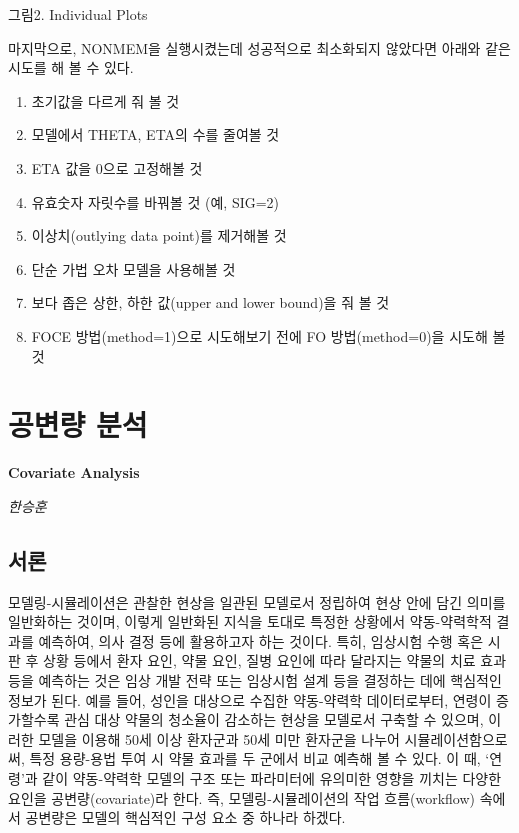 \documentclass[
  10pt,
]{krantz}
\providecommand{\tightlist}{%
  \setlength{\itemsep}{0pt}\setlength{\parskip}{0pt}}
\begin{document}
그림2. Individual Plots

마지막으로, NONMEM을 실행시켰는데 성공적으로 최소화되지 않았다면 아래와 같은 시도를 해 볼 수 있다.

\begin{enumerate}
\def\labelenumi{\arabic{enumi}.}
\tightlist
\item
  초기값을 다르게 줘 볼 것
\item
  모델에서 THETA, ETA의 수를 줄여볼 것
\item
  ETA 값을 0으로 고정해볼 것
\item
  유효숫자 자릿수를 바꿔볼 것 (예, SIG=2)
\item
  이상치(outlying data point)를 제거해볼 것
\item
  단순 가법 오차 모델을 사용해볼 것
\item
  보다 좁은 상한, 하한 값(upper and lower bound)을 줘 볼 것
\item
  FOCE 방법(method=1)으로 시도해보기 전에 FO 방법(method=0)을 시도해 볼 것
\end{enumerate}

\hypertarget{uxacf5uxbcc0uxb7c9-uxbd84uxc11d}{%
\chapter{공변량 분석}\label{uxacf5uxbcc0uxb7c9-uxbd84uxc11d}}

\textbf{Covariate Analysis}

\emph{한승훈}

\hypertarget{uxc11cuxb860-1}{%
\section{서론}\label{uxc11cuxb860-1}}

모델링-시뮬레이션은 관찰한 현상을 일관된 모델로서 정립하여 현상 안에 담긴 의미를 일반화하는 것이며, 이렇게 일반화된 지식을
토대로 특정한 상황에서 약동-약력학적 결과를 예측하여, 의사 결정 등에 활용하고자 하는 것이다. 특히, 임상시험 수행
혹은 시판 후 상황 등에서 환자 요인, 약물 요인, 질병 요인에 따라 달라지는 약물의 치료 효과 등을 예측하는 것은 임상 개발
전략 또는 임상시험 설계 등을 결정하는 데에 핵심적인 정보가 된다. 예를 들어, 성인을 대상으로 수집한 약동-약력학 데이터로부터,
연령이 증가할수록 관심 대상 약물의 청소율이 감소하는 현상을 모델로서 구축할 수 있으며, 이러한 모델을 이용해 50세 이상
환자군과 50세 미만 환자군을 나누어 시뮬레이션함으로써, 특정 용량-용법 투여 시 약물 효과를 두 군에서 비교
예측해 볼 수 있다. 이 때, `연령'과 같이 약동-약력학 모델의 구조 또는 파라미터에 유의미한 영향을 끼치는 다양한
요인을 공변량(covariate)라 한다. 즉, 모델링-시뮬레이션의 작업 흐름(workflow) 속에서 공변량은 모델의
핵심적인 구성 요소 중 하나라 하겠다.
\end{document}
